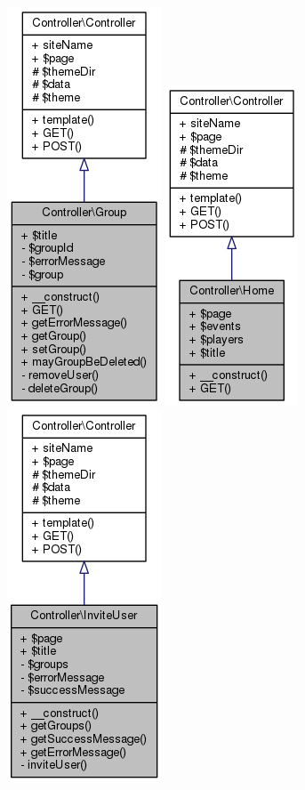 \documentclass[11pt]{article}
\begin{document}
\includegraphics[scale=0.4]{UML_Controller_1_1Group.png}
\includegraphics[scale=0.4]{UML_Controller_1_1Home.png}
\includegraphics[scale=0.4]{UML_Controller_1_1InviteUser.png}
\end{document}
